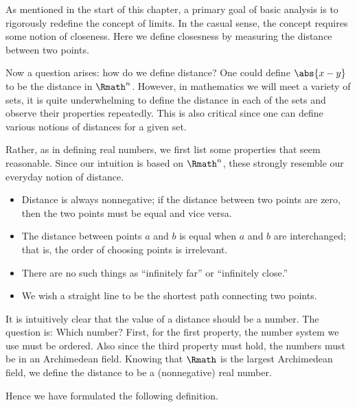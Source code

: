  \label{sec:metric}

As mentioned in the start of this chapter,
a primary goal of basic analysis
is to rigorously redefine the concept of limits.
In the casual sense,
the concept requires some notion of closeness.
Here we define closesness by measuring the distance between two points.

Now a question arises:
how do we define distance?
One could define \(\abs{x-y}\) to be the distance in \(\Rmath^n\).
However, in mathematics we will meet a variety of sets,
it is quite underwhelming to
define the distance in each of the sets
and observe their properties repeatedly.
This is also critical since
one can define various notions of distances for a given set.

Rather, as in defining real numbers,
we first list some properties that seem reasonable.
Since our intuition is based on \(\Rmath^n\),
these strongly resemble our everyday notion of distance.

\begin{itemize}
    \item Distance is always nonnegative;
    if the distance between two points are zero,
    then the two points must be equal and vice versa.
    
    \item The distance between points \(a\) and \(b\)
    is equal when \(a\) and \(b\) are interchanged;
    that is,
    the order of choosing points is irrelevant.
    
    \item There are no such things
    as ``infinitely far'' or ``infinitely close.''
    
    \item We wish a straight line to be the shortest path
    connecting two points.
\end{itemize}

It is intuitively clear that
the value of a distance should be a number.
The question is: Which number?
First, for the first property,
the number system we use must be ordered.
Also since the third property must hold,
the numbers must be in an Archimedean field.
Knowing that \(\Rmath\) is the largest Archimedean field,
we define the distance to be a (nonnegative) real number.

Hence we have formulated the following definition.


